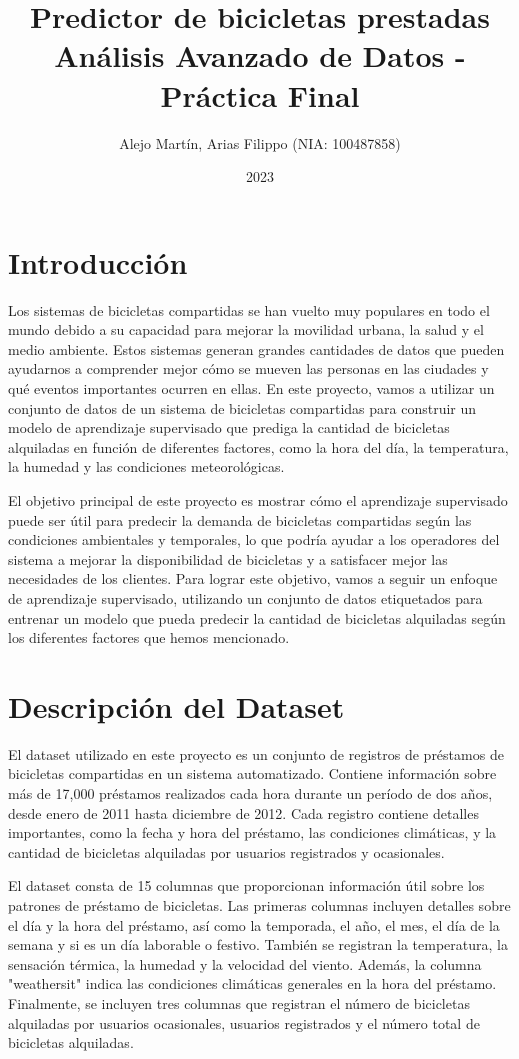 \documentclass{wsdcr}
\title{%
    Predictor de bicicletas prestadas \\
    \large Análisis Avanzado de Datos - Práctica Final }
\author{Alejo Martín, Arias Filippo (NIA: 100487858)}
\date{2023}
\begin{document}
\maketitle

\section{Introducción}
Los sistemas de bicicletas compartidas se han vuelto muy populares en todo el mundo debido a su capacidad para mejorar la movilidad urbana, la salud y el medio ambiente. Estos sistemas generan grandes cantidades de datos que pueden ayudarnos a comprender mejor cómo se mueven las personas en las ciudades y qué eventos importantes ocurren en ellas. En este proyecto, vamos a utilizar un conjunto de datos de un sistema de bicicletas compartidas para construir un modelo de aprendizaje supervisado que prediga la cantidad de bicicletas alquiladas en función de diferentes factores, como la hora del día, la temperatura, la humedad y las condiciones meteorológicas.

El objetivo principal de este proyecto es mostrar cómo el aprendizaje supervisado puede ser útil para predecir la demanda de bicicletas compartidas según las condiciones ambientales y temporales, lo que podría ayudar a los operadores del sistema a mejorar la disponibilidad de bicicletas y a satisfacer mejor las necesidades de los clientes. Para lograr este objetivo, vamos a seguir un enfoque de aprendizaje supervisado, utilizando un conjunto de datos etiquetados para entrenar un modelo que pueda predecir la cantidad de bicicletas alquiladas según los diferentes factores que hemos mencionado.


\section{Descripción del Dataset}
El dataset utilizado en este proyecto es un conjunto de registros de préstamos de bicicletas compartidas en un sistema automatizado. Contiene información sobre más de 17,000 préstamos realizados cada hora durante un período de dos años, desde enero de 2011 hasta diciembre de 2012. Cada registro contiene detalles importantes, como la fecha y hora del préstamo, las condiciones climáticas, y la cantidad de bicicletas alquiladas por usuarios registrados y ocasionales.

El dataset consta de 15 columnas que proporcionan información útil sobre los patrones de préstamo de bicicletas. Las primeras columnas incluyen detalles sobre el día y la hora del préstamo, así como la temporada, el año, el mes, el día de la semana y si es un día laborable o festivo. También se registran la temperatura, la sensación térmica, la humedad y la velocidad del viento. Además, la columna "weathersit" indica las condiciones climáticas generales en la hora del préstamo. Finalmente, se incluyen tres columnas que registran el número de bicicletas alquiladas por usuarios ocasionales, usuarios registrados y el número total de bicicletas alquiladas.
\end{document}
